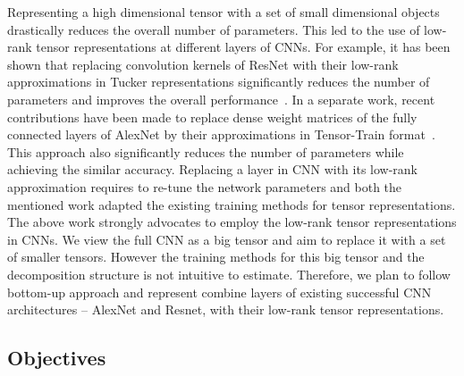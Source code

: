 Representing a high dimensional tensor with a set of small dimensional objects drastically reduces the overall number of parameters. This led to the use of low-rank tensor representations at different layers of CNNs. For example, it has been shown that replacing convolution kernels of ResNet with their low-rank approximations in Tucker representations significantly reduces the number of parameters and improves the overall performance~\cite{PSSEG+-ECCV2020}. In a separate work, recent contributions have been made to replace dense weight matrices of the fully connected layers of AlexNet by their approximations in Tensor-Train format~\cite{NPOV-NIPS2015}. This approach also significantly reduces the number of parameters while achieving the similar accuracy. Replacing a layer in CNN with its low-rank approximation requires to re-tune the network parameters and both the mentioned work adapted the existing training methods for tensor representations. The above work strongly advocates to employ the low-rank tensor representations in CNNs. We view the full CNN as a big tensor and aim to replace it with a set of smaller tensors. However the training methods for this big tensor and the decomposition structure is not intuitive to estimate. Therefore, we plan to follow bottom-up approach and represent combine layers of existing successful CNN architectures -- AlexNet and Resnet, with their low-rank tensor representations.






%	


\subsection*{Objectives}
%

